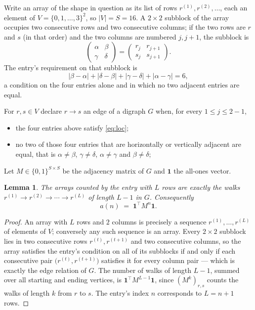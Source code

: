 \documentclass[11pt,a4paper]{article}
\theoremstyle{plain}
\newtheorem{lemma}[theorem]{Lemma}
\theoremstyle{definition}
\begin{document}
Write an array of the shape in question as its list of rows
$r^{(1)},r^{(2)},\dots$, each an element of
$V=\{0,1,\dots,3\}^{2}$, so $|V|=S=16$. A $2\times2$ subblock of the array
occupies two consecutive rows and two consecutive columns; if the two rows are $r$
and $s$ (in that order) and the two columns are numbered $j,j+1$,
the subblock is
\[
\begin{pmatrix}\alpha&\beta\\\gamma&\delta\end{pmatrix}=\begin{pmatrix}r_j&r_{j+1}\\s_j&s_{j+1}\end{pmatrix}.
\]
The entry's requirement on that subblock is
\begin{equation}\label{eq:loc}
|\beta-\alpha|+|\delta-\beta|+|\gamma-\delta|+|\alpha-\gamma|=6,
\end{equation}
a condition on the four entries alone and in which no two adjacent entries are equal.

For $r,s\in V$ declare $r\to s$ an edge of a digraph $G$ when, for every
$1\le j\le 2-1$,
\begin{itemize}
\item the four entries above satisfy \eqref{eq:loc};
\item no two of those four entries that are horizontally or vertically adjacent are equal, that is $\alpha\ne\beta$, $\gamma\ne\delta$, $\alpha\ne\gamma$ and $\beta\ne\delta$;
\end{itemize}
Let $M\in\{0,1\}^{S\times S}$ be the adjacency matrix of $G$ and $\mathbf{1}$ the
all-ones vector.

\begin{lemma}\label{lem:walk}
The arrays counted by the entry with $L$ rows are exactly the walks
$r^{(1)}\to r^{(2)}\to\cdots\to r^{(L)}$ of length $L-1$ in $G$. Consequently
\[
a(n)\;=\;\mathbf{1}^{\!\top}M^{n}\mathbf{1} .
\]
\end{lemma}

\begin{proof}
An array with $L$ rows and $2$ columns is precisely a sequence
$r^{(1)},\dots,r^{(L)}$ of elements of $V$; conversely any such sequence is an array.
Every $2\times2$ subblock lies in two consecutive rows $r^{(t)},r^{(t+1)}$ and two
consecutive columns, so the array satisfies the entry's condition on all of its subblocks
if and only if each consecutive pair $\bigl(r^{(t)},r^{(t+1)}\bigr)$ satisfies it for
every column pair --- which is exactly the edge relation of $G$. The number of walks of
length $L-1$, summed over all starting and ending vertices, is
$\mathbf{1}^{\!\top}M^{L-1}\mathbf{1}$, since $(M^{k})_{r,s}$ counts the walks of
length $k$ from $r$ to $s$. The entry's index $n$ corresponds to $L=n+1$ rows.
\end{proof}
\end{document}
